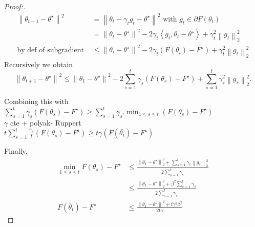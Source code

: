 \begin{proof}[Proof:]
    \begin{align*}
        \left\| \theta _{t + 1} - \theta ^\star  \right\| ^2 
            &= \left\| \theta _t - \gamma _t g_t - \theta ^\star  \right\| ^2 \text{ with } g_t \in \partial F(\theta _t) \\
            &= \left\| \theta _t - \theta ^\star  \right\| ^2 - 2 \gamma _t \left\langle g_t , \theta _t - \theta ^\star \right\rangle + \gamma _t ^2 \left\| g_t \right\| _2 ^2 \\
            \text{by def of subgradient } &\leq \left\| \theta _t - \theta ^\star  \right\| ^2 - 2 \gamma _t (F(\theta _t) - F^\star ) + \gamma _t ^2 \left\| g_t \right\| _2 ^2 
    \end{align*}
    Recursively we obtain 
    \[
        \left\| \theta _{t+1} - \theta ^\star  \right\| ^2 \leq  \left\| \theta _1 - \theta ^\star  \right\| ^2 - 2 \sum_{s=1}^{t} \gamma _s (F(\theta _s) - F^\star ) + \sum_{s=1}^{t} \gamma _s ^2 \left\| g_s \right\| _2 ^2 
    .\]
    
    Combining this with $\sum_{s=1}^t \gamma _s (F(\theta _s) - F^{\star }) \geq \sum_{s=1}^t \gamma_s. \min_{1 \leq s \leq t} (F(\theta _s) - F^{\star })$ \\
    $\gamma$ cte + polyak- Ruppert \\
    $t \sum_{s=1}^t \frac{\gamma_s}{t}(F(\theta _s) - F^{\star }) \geq t \gamma (F(\bar{\theta _t}) - F^{\star })$ 


    Finally, 
    \begin{align*}
        \min _{1 \leq s \leq t} F (\theta _s) - F^\star 
        &\leq \frac{\left\| \theta _1 - \theta ^\star  \right\|_2 ^2 + \sum_{s=1}^{t} \gamma _s \left\| g_s \right\|_2 ^2  }{2 \sum_{s=1}^{t} \gamma _s} \\
        &\leq \frac{\left\| \theta _1 - \theta ^\star  \right\|_2 ^2 + \beta ^2 \sum_{s=1}^{t} \gamma _s  }{2 \sum_{s=1}^{t} \gamma _s} \\
        F(\bar{\theta}_t) - F^\star &\leq \frac{\left\| \theta _1 - \theta ^\star  \right\| ^2 + t \gamma ^2 \beta ^2}{2t \gamma}
    \end{align*}
\end{proof}

